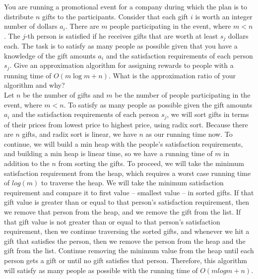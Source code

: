 \documentclass{article}
\begin{document}
 You are running a promotional event for a
company during which the plan is to distribute $n$ gifts to the
participants. Consider that each gift $i$ is worth an integer number
of dollars $a_i$. There are $m$ people participating in the event,
where $m < n$. The $j$-th person is satisfied if he receives gifts
that are worth at least $s_j$ dollars each. The task is to satisfy as
many people as possible given that you have a knowledge of the gift
amounts $a_i$ and the satisfaction requirements of each person
$s_j$. Give an approximation algorithm for assigning rewards to people
with a running time of $O(m\log m+n)$. What is the approximation ratio
of your algorithm and why?\\

\noindent Let $n$ be the number of gifts and $m$ be the number of people participating in the event, where $m<n$. To satisfy as many people as possible given the gift amounts $a_i$ and the satisfaction requirements of each person $s_j$, we will sort gifts in terms of their prices from lowest price to highest price, using radix sort. Because there are $n$ gifts, and radix sort is linear, we have $n$ as our running time now. To continue, we will build a min heap with the people's satisfaction requirements, and building a min heap is linear time, so we have a running time of $m$ in addition to the $n$ from sorting the gifts. To proceed, we will take the minimum satisfaction requirement from the heap, which requires a worst case running time of $log(m)$ to traverse the heap. We will take the minimum satisfaction requirement and compare it to first value -- smallest value -- in sorted gifts. If that gift value is greater than or equal to that person's satisfaction requirement, then we remove that person from the heap, and we remove the gift from the list. If that gift value is not greater than or equal to that person's satisfaction requirement, then we continue traversing the sorted gifts, and whenever we hit a gift that satisfies the person, then we remove the person from the heap and the gift from the list. Continue removing the minimum value from the heap until each person gets a gift or until no gift satisfies that person. Therefore, this algorithm will satisfy as many people as possible with the running time of $O(mlogm + n)$.
\end{document}
